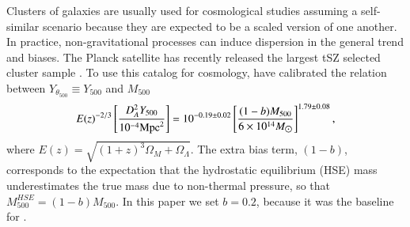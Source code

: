 \documentclass[twocolumn,traditabstract]{aa}
\begin{document}
Clusters of galaxies are usually used for cosmological studies assuming a self-similar scenario because they are expected to be a scaled version of one another. In practice, non-gravitational processes can induce dispersion in the general trend and biases. The Planck satellite has recently released the largest tSZ selected cluster sample \citep[1227 objects,][]{planck2013catalogue}. To use this catalog for cosmology, \cite{planck2013cluster_count} have calibrated the relation between $Y_{\theta_{500}} \equiv Y_{500}$ and $M_{500}$ 
\begin{equation}
	E(z)^{-2/3} \left[\frac{D_A^2 Y_{500}}{10^{-4} {\rm Mpc}^2}\right] = 10^{-0.19 \pm 0.02} \left[\frac{(1-b) M_{500}}{6 \times 10^{14} M_{\hbox{$\odot$}}}\right]^{1.79 \pm 0.08},
\label{eq:Y500M500}
\end{equation}
where $E(z) = \sqrt{(1+z)^3 \Omega_M + \Omega_{\Lambda}}$. The extra bias term, $(1-b)$, corresponds to the expectation that the hydrostatic equilibrium (HSE) mass underestimates the true mass due to non-thermal pressure, so that $M^{HSE}_{500} = (1-b) M_{500}$. In this paper we set $b=0.2$, because it was the baseline for \cite{planck2013cluster_count}.
\end{document}

